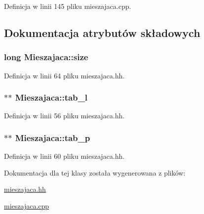 Definicja w linii 145 pliku mieszajaca.\-cpp.



\subsection{Dokumentacja atrybutów składowych}
\hypertarget{class_mieszajaca_a6521d97bf16d4fd92d147aafd2a56e3f}{
\subsubsection[{size}]{\setlength{\rightskip}{0pt plus 5cm}long Mieszajaca\-::size\hspace{0.3cm}{\ttfamily [private]}}}\label{class_mieszajaca_a6521d97bf16d4fd92d147aafd2a56e3f}


Definicja w linii 64 pliku mieszajaca.\-hh.

\hypertarget{class_mieszajaca_adb0f4884ed63b184cf0bd63e757490cd}{
\subsubsection[{tab\-\_\-l}]{$\ast$$\ast$ Mieszajaca\-::tab\-\_\-l\hspace{0.3cm}{\ttfamily [private]}}}\label{class_mieszajaca_adb0f4884ed63b184cf0bd63e757490cd}


Definicja w linii 56 pliku mieszajaca.\-hh.

\hypertarget{class_mieszajaca_a37e86d776d7eeef64b36f04e91b44a4c}{
\subsubsection[{tab\-\_\-p}]{$\ast$$\ast$ Mieszajaca\-::tab\-\_\-p\hspace{0.3cm}{\ttfamily [private]}}}\label{class_mieszajaca_a37e86d776d7eeef64b36f04e91b44a4c}


Definicja w linii 60 pliku mieszajaca.\-hh.



Dokumentacja dla tej klasy została wygenerowana z plików\-:\begin{DoxyCompactItemize}
\item 
\hyperlink{mieszajaca_8hh}{mieszajaca.\-hh}\item 
\hyperlink{mieszajaca_8cpp}{mieszajaca.\-cpp}\end{DoxyCompactItemize}
